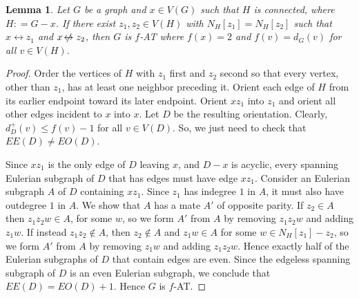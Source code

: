 \documentclass[12pt]{article}
\theoremstyle{plain}
\newtheorem{lem}[thm]{Lemma}
\theoremstyle{definition}
\theoremstyle{remark}
\newcommand{\DefinedAs}{\mathrel{\mathop:}=}
\def\adj{\leftrightarrow}
\def\nonadj{\not\!\leftrightarrow}
\begin{document}
	\begin{lem}\label{GeneralEulerLemma}
		Let $G$ be a graph and $x \in V(G)$ such that $H$ is connected, where $H \DefinedAs G-x$. 
		If there exist $z_1, z_2 \in V(H)$ with $N_H[z_1] = N_H[z_2]$ such that $x \adj
		z_1$ and $x \nonadj z_2$, then $G$ is $f$-AT where $f(x) = 2$ and $f(v) =
		d_G(v)$ for all $v \in V(H)$.
	\end{lem}
	\begin{proof}
		Order the vertices of $H$ with $z_1$ first and $z_2$ second so that every
		vertex, other than $z_1$, has at least one neighbor preceding it. 
		Orient each edge of $H$ from its earlier endpoint toward its later endpoint. 
		Orient $xz_1$ into $z_1$ and orient all other
		edges incident to $x$ into $x$.  Let $D$ be the resulting orientation. 
		Clearly, $d_{D}^+(v) \le f(v) - 1$ for all $v \in V(D)$.  So, we just need to
		check that $EE(D) \ne EO(D)$.  
		
		Since $xz_1$ is the only edge of $D$ leaving
		$x$, and $D-x$ is acyclic, every spanning Eulerian subgraph of $D$ that has
		edges must have edge $xz_1$.  
		Consider an Eulerian subgraph $A$ of $D$ containing $xz_1$. Since $z_1$ %
		has indegree $1$ in $A$, it must also have outdegree $1$ in $A$.  We show
		that $A$ has a mate $A'$ of opposite parity.  
		If $z_2 \in A$ then $z_1z_2w \in A$, for some $w$, so we form
		$A'$ from $A$ by removing $z_1z_2w$ and adding $z_1w$. 
		If instead $z_1z_2\notin A$, then $z_2 \not \in A$ and $z_1w \in
		A$ for some $w \in N_H[z_1]-z_2$, so we form $A'$ from $A$ by removing $z_1w$ and
		adding $z_1z_2w$.  
		Hence exactly half of the Eulerian subgraphs of $D$ that contain edges are
		even.  Since the edgeless spanning subgraph of $D$ is an even Eulerian
		subgraph, we conclude that $EE(D) = EO(D) + 1$.  Hence $G$ is $f$-AT.
	\end{proof}
	
\end{document}
